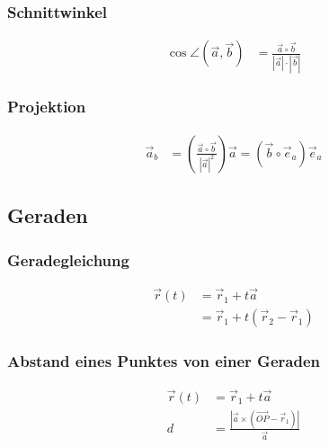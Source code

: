 \begin{multicols}{2}
\subsubsection*{Schnittwinkel}
\begin{align*} 
\cos\angle(\vec{a},\vec{b})&=\frac{\vec{a}\circ\vec{b}}{|\vec{a}|\cdot|\vec{b}|}
\end{align*}
\vfill
\subsubsection*{Projektion}
\begin{align*} 
\vec{a}_b&=\left(\frac{\vec{a}\circ\vec{b}}{|\vec{a}|^2}\right)\vec{a}=(\vec{b}\circ\vec{e}_a)\vec{e}_a
\end{align*}
\vfill
\end{multicols}

\newpage
\subsection{Geraden}
\begin{multicols}{2}
\subsubsection*{Geradegleichung}
\begin{align*} 
\vec{r}(t) &=\vec{r}_1+t\vec{a}\\
	  &=\vec{r}_1+t(\vec{r}_2-\vec{r}_1)
\end{align*}
\vfill
\subsubsection*{Abstand eines Punktes von einer Geraden}
\begin{align*} 
\vec{r}(t) &=\vec{r}_1+t\vec{a}\\
d&=\frac{|\vec{a}\times\left(\vec{OP}-\vec{r}_1\right)|}{\vec{a}}
\end{align*}
\vfill
\end{multicols}

